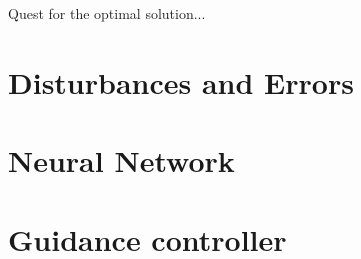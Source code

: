 Quest for the optimal solution...

\section{Disturbances and Errors}
\label{section:results/disturbances_errors}


\section{Neural Network}
\label{section:results/NN}

\section{Guidance controller}
\label{section:results/guidance_control}


